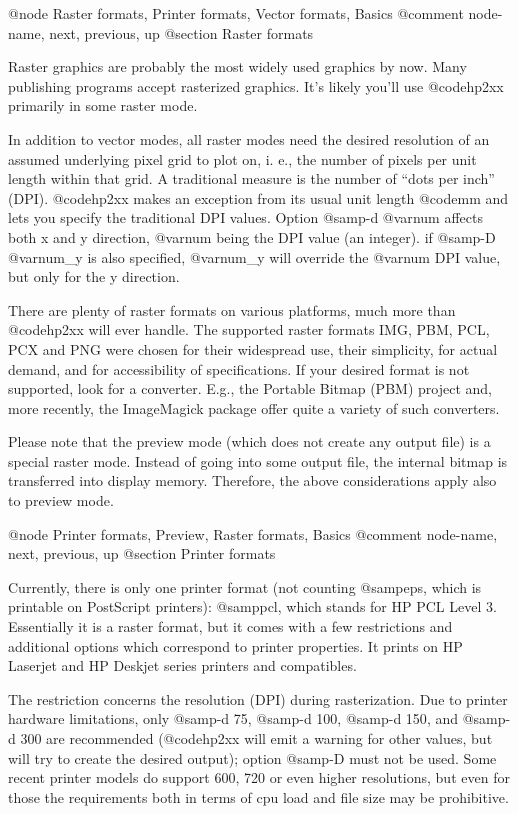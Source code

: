 @node Raster formats, Printer formats, Vector formats, Basics
@comment  node-name,  next,  previous,  up
@section Raster formats

Raster graphics are probably the most widely used graphics by now.
Many publishing programs accept rasterized graphics. It's likely you'll
use @code{hp2xx} primarily in some raster mode.

In addition to vector modes, all raster modes need the desired resolution
of an assumed underlying pixel grid to plot on, i. e., the number of
pixels per unit length within that grid.
A traditional measure is the number of ``dots per inch'' (DPI).
@code{hp2xx} makes an exception from its usual unit length @code{mm} and
lets you specify the traditional DPI values.
Option @samp{-d @var{num}} affects both x and y direction, @var{num} being
the DPI value (an integer). if @samp{-D @var{num_y}} is also specified,
@var{num_y} will override the @var{num} DPI value, but only for the y
direction.

There are plenty of raster formats on various platforms, much more
than @code{hp2xx} will ever handle. The supported raster formats
IMG, PBM, PCL, PCX and PNG were chosen for their widespread use, their simplicity,
for actual demand, and for accessibility of specifications.
If your desired format is not supported, look for a converter. E.g., the
Portable Bitmap (PBM) project and, more recently, the ImageMagick package 
offer quite a variety of such converters.

Please note that the preview mode (which does not create any output file)
is a special raster mode. Instead of going into some output file,
the internal bitmap is transferred into display memory.
Therefore, the above considerations apply also to preview mode.




@node Printer formats, Preview, Raster formats, Basics
@comment  node-name,  next,  previous,  up
@section Printer formats

Currently, there is only one printer format (not counting @samp{eps}, which
is printable on PostScript printers): @samp{pcl}, which stands for HP PCL
Level 3. Essentially it is a raster format, but it comes with a few
restrictions and additional options which correspond to printer properties.
It prints on HP Laserjet and HP Deskjet series printers and compatibles.

The restriction concerns the resolution (DPI) during rasterization. Due to
printer hardware limitations, only @samp{-d 75}, @samp{-d 100}, @samp{-d 150},
and @samp{-d 300} are recommended (@code{hp2xx} will emit a warning for other
values, but will try to create the desired output); option @samp{-D} must not 
be used. Some recent printer models do support 600, 720 or even higher
resolutions, but even for those the requirements both in terms of cpu load
and file size may be prohibitive.

